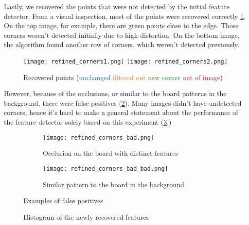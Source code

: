 Lastly, we recovered the points that were not detected by the initial feature
detector.
From a visual inspection, most of the points were recovered correctly
\cref{fig:recovered_good_points}.
On the top image, for example, there are green points close to the edge.
Those corners weren't detected initially due to high distortion. On the bottom
image, the algorithm found another row of corners, which weren't detected previously.

\begin{figure}[h]
	\centering
	\texttt{[image: refined\_corners1.png]}
	\texttt{[image: refined\_corners2.png]}

	\caption{Recovered points
		(\textcolor[HTML]{1f77b4}{unchanged}
		\textcolor[HTML]{ff7f0e}{filtered out}
		\textcolor[HTML]{2ca02c}{new corner}
		\textcolor[HTML]{d62728}{out of image})}
	\label{fig:recovered_good_points}
\end{figure}

\newpage
However,
because of the occlusions, or similar to the board patterns in the background,
there were false positives (\cref{fig:recovered_bad_points}). Many images didn't
have undetected corners, hence it's hard to make a general statement about the
performance of the feature detector solely based on this experiment
(\cref{fig:recovered_points_histogram}.)

\begin{figure}[h]
	\centering
	\begin{subfigure}[h]{0.6\linewidth}
		\texttt{[image: refined\_corners\_bad.png]}
		\caption{Occlusion on the board with distinct features}
	\end{subfigure}
	\begin{subfigure}[h]{0.6\linewidth}
		\texttt{[image: refined\_corners\_bad\_bad.png]}
		\caption{Similar pattern to the board in the background}
	\end{subfigure}
	\caption{Examples of false positives}
	\label{fig:recovered_bad_points}
\end{figure}

\begin{figure}[h!]
	\caption{Histogram of the newly recovered features}
	\label{fig:recovered_points_histogram}
\end{figure}

